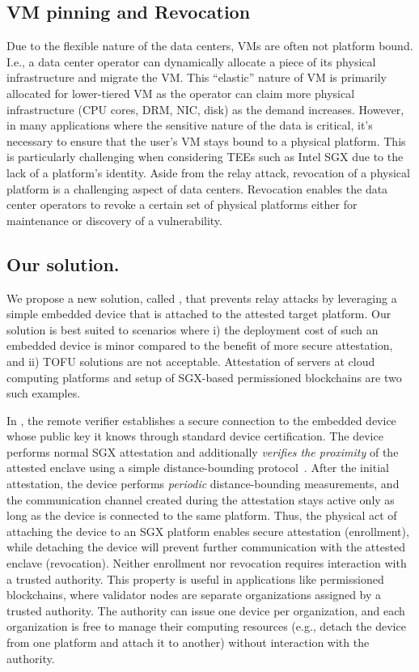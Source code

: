 \subsection{VM pinning and Revocation} Due to the flexible nature of the data centers, VMs are often not platform bound. I.e., a data center operator can dynamically allocate a piece of its physical infrastructure and migrate the VM. This ``elastic'' nature of VM is primarily allocated for lower-tiered VM as the operator can claim more physical infrastructure (CPU cores, DRM, NIC, disk) as the demand increases. However, in many applications where the sensitive nature of the data is critical, it's necessary to ensure that the user's VM stays bound to a physical platform. This is particularly challenging when considering TEEs such as Intel SGX due to the lack of a platform's identity. Aside from the relay attack, revocation of a physical platform is a challenging aspect of data centers. Revocation enables the data center operators to revoke a certain set of physical platforms either for maintenance or discovery of a vulnerability.

\subsection{Our solution.} We propose a new solution, called \name, that prevents relay attacks by leveraging a simple embedded device that is attached to the attested target platform. Our solution is best suited to scenarios where i) the deployment cost of such an embedded device is minor compared to the benefit of more secure attestation, and ii) TOFU solutions are not acceptable. Attestation of servers at cloud computing platforms and setup of SGX-based permissioned blockchains are two such examples. 

In \name, the remote verifier establishes a secure connection to the embedded device whose public key it knows through standard device certification. The device performs normal SGX attestation and additionally \emph{verifies the proximity} of the attested enclave using a simple distance-bounding protocol~\cite{distanceBounding}. After the initial attestation, the device performs \emph{periodic} distance-bounding measurements, and the communication channel created during the attestation stays active only as long as the device is connected to the same platform. Thus, the physical act of attaching the device to an SGX platform enables secure attestation (enrollment), while detaching the device will prevent further communication with the attested enclave (revocation). Neither enrollment nor revocation requires interaction with a trusted authority. This property is useful in applications like permissioned blockchains, where validator nodes are separate organizations assigned by a trusted authority. The authority can issue one device per organization, and each organization is free to manage their computing resources (e.g., detach the device from one platform and attach it to another) without interaction with the authority. 


